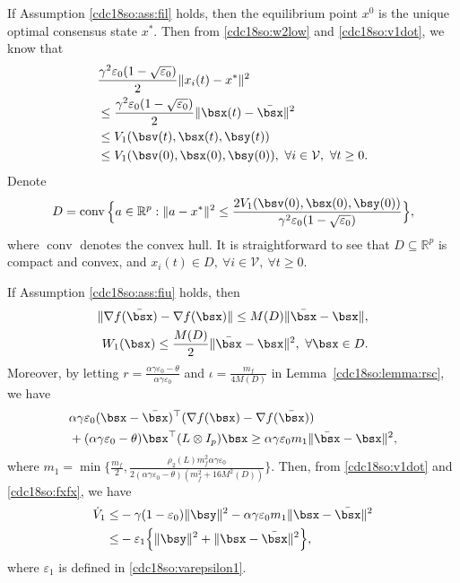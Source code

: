 \documentclass[letterpaper, 10 pt, conference]{ieeeconf}  %
\DeclareMathOperator{\conv}{conv}
\begin{document}
If Assumption \ref{cdc18so:ass:fil} holds, then the equilibrium point $x^0$ is the unique optimal consensus state $x^*$.
Then from \eqref{cdc18so:w2low} and \eqref{cdc18so:v1dot}, we know that \begin{align*}
&\frac{\gamma^2\varepsilon_0(1-\sqrt{\varepsilon_0})}{2}\|x_i(t)-x^*\|^2\\
&\le\frac{\gamma^2\varepsilon_0(1-\sqrt{\varepsilon_0})}{2}\|\bsx(t)-\bar{\bsx}\|^2\\
&\le V_1(\bsv(t),\bsx(t),\bsy(t))\\
&\le V_1(\bsv(0),\bsx(0),\bsy(0)),~\forall i\in\mathcal V,~\forall t\ge0.
\end{align*}
Denote
\begin{equation}\label{cdc18so:convexset}
D=\conv \Big\{a\in\mathbb{R}^p:\|a-x^*\|^2\le
\frac{2V_1(\bsv(0),\bsx(0),\bsy(0))}{\gamma^2\varepsilon_0(1-\sqrt{\varepsilon_0})}\Big\},
\end{equation}
where $\conv$ denotes the convex hull. It is straightforward to see that $D\subseteq\mathbb{R}^p$ is compact and convex, and $x_i(t)\in D,~\forall i\in\mathcal V,~\forall t\ge0$.

If Assumption \ref{cdc18so:ass:fiu} holds, then
\begin{align}
\|\nabla f(\bar{\bsx})-\nabla f(\bsx)\|\le M(D)\|\bar{\bsx}-\bsx\|,\label{cdc18so:fxbarfx}\\
W_1(\bsx)\le\frac{M(D)}{2}\|\bar{\bsx}-\bsx\|^2,~\forall \bsx\in D.\label{cdc18so:w1up}
\end{align}
Moreover, by letting $r=\frac{\alpha\gamma\varepsilon_0-\theta}{\alpha\gamma\varepsilon_0}$ and $\iota=\frac{m_f}{4M(D)}$ in Lemma~\ref{cdc18so:lemma:rsc}, we have
\begin{align}
&\alpha\gamma\varepsilon_0(\bsx-\bar{\bsx})^\top(\nabla f(\bsx)-\nabla f(\bar{\bsx}))\nonumber\\
&+(\alpha\gamma\varepsilon_0-\theta)\bsx^\top(L\otimes I_p)\bsx
\ge \alpha\gamma\varepsilon_0m_1\|\bar{\bsx}-\bsx\|^2,\label{cdc18so:fxfx}
\end{align}
where $m_1=\min\Big\{\frac{m_f}{2},\frac{\rho_2(L)m_f^2\alpha\gamma\varepsilon_0}
{2(\alpha\gamma\varepsilon_0-\theta)(m^2_f+16M^2(D))}\Big\}$.
Then, from \eqref{cdc18so:v1dot} and \eqref{cdc18so:fxfx}, we have
\begin{align}\label{cdc18so:w2dot2}
\dot{V}_1
\le& -\gamma(1-\varepsilon_0)\|\bsy\|^2-\alpha\gamma\varepsilon_0m_1\|\bsx-\bar{\bsx}\|^2\nonumber\\
\le&-\varepsilon_1\Big\{\|\bsy\|^2+\|\bsx-\bar{\bsx}\|^2\Big\},
\end{align}
where $\varepsilon_1$ is defined in \eqref{cdc18so:varepsilon1}.%
\end{document}
